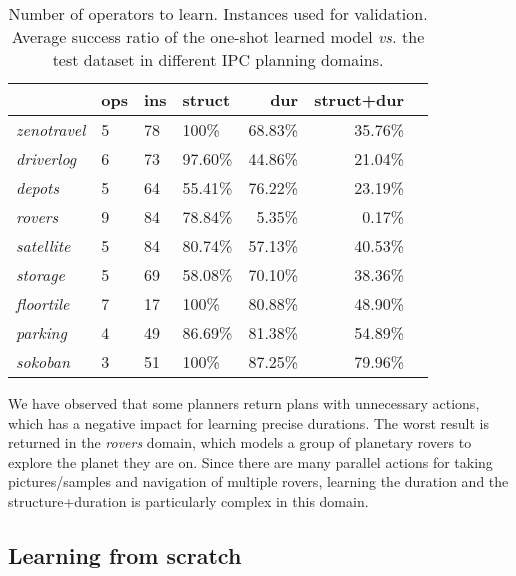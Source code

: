 \documentclass{ecai}
\begin{document}
\begin{table}
\begin{scriptsize}
\begin{tabular}{p{2cm}lllrrr}
& {\bf ops} & {\bf ins} & {\bf struct} & {\bf dur} & {\bf struct+dur}  \\\hline

\emph{zenotravel} & 5 & 78 & 100\% & 68.83\% & 35.76\% \\
\emph{driverlog} & 6 & 73 & 97.60\% & 44.86\% & 21.04\% \\
\emph{depots} & 5 & 64 & 55.41\% & 76.22\% & 23.19\% \\
\emph{rovers} & 9 & 84 & 78.84\% & 5.35\% & 0.17\% \\
\emph{satellite} & 5 & 84 & 80.74\% & 57.13\% & 40.53\% \\
\emph{storage} & 5 & 69 & 58.08\% & 70.10\% & 38.36\% \\
\emph{floortile} & 7 & 17 & 100\% & 80.88\% & 48.90\%\\
\emph{parking} & 4 & 49 & 86.69\% & 81.38\% & 54.89\% \\
\emph{sokoban} & 3 & 51 & 100\% & 87.25\% & 79.96\% \\

\end{tabular}
\end{scriptsize}
\caption{\small Number of operators to learn. Instances used for validation. Average success ratio of the one-shot learned model \emph{vs.} the test dataset in different IPC planning domains.}
\label{table:evaluationExperiments}
\end{table}


We have observed that some planners return plans with unnecessary actions, which has a negative impact for learning precise durations.
The worst result is returned in the \emph{rovers} domain, which models a group of planetary rovers to explore the planet they are on. Since there are many parallel actions for taking pictures/samples and navigation of multiple rovers, learning the duration and the structure+duration is particularly complex in this domain.

\subsection{Learning from scratch}
\end{document}
